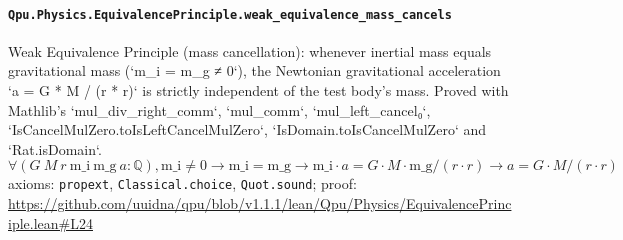\documentclass[11pt]{article}
\begin{document}
\paragraph{\texttt{Qpu.Physics.EquivalencePrinciple.weak\_equivalence\_mass\_cancels}}
Weak Equivalence Principle (mass cancellation): whenever inertial mass equals gravitational mass (`m\_i = m\_g ≠ 0`), the Newtonian gravitational acceleration `a = G * M / (r * r)` is strictly independent of the test body's mass. Proved with Mathlib's `mul\_div\_right\_comm`, `mul\_comm`, `mul\_left\_cancel₀`, `IsCancelMulZero.toIsLeftCancelMulZero`, `IsDomain.toIsCancelMulZero` and `Rat.isDomain`.
\[ \forall (G\ M\ r\ \mathrm{m\_i}\ \mathrm{m\_g}\ a : \mathbb{Q}), \mathrm{m\_i} \ne 0 \to \mathrm{m\_i} = \mathrm{m\_g} \to \mathrm{m\_i} \cdot a = G \cdot M \cdot \mathrm{m\_g} / (r \cdot r) \to a = G \cdot M / (r \cdot r) \]
\noindent axioms: \texttt{propext}, \texttt{Classical.choice}, \texttt{Quot.sound}; proof: \url{https://github.com/uuidna/qpu/blob/v1.1.1/lean/Qpu/Physics/EquivalencePrinciple.lean\#L24}
\end{document}
